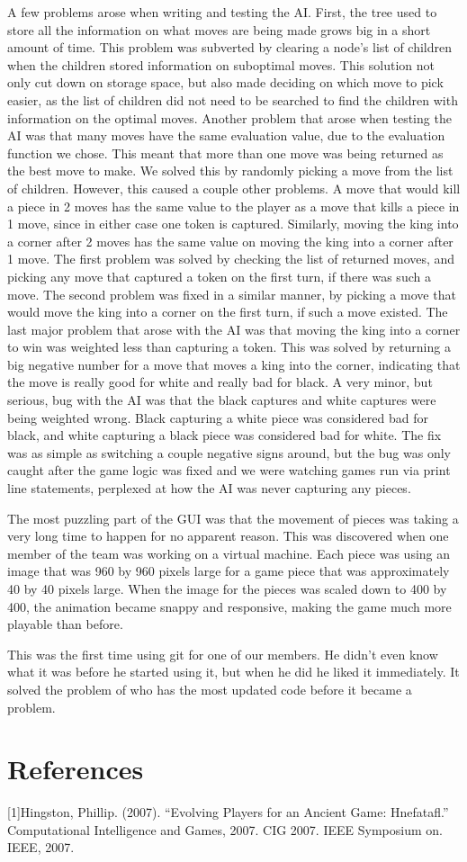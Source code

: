 \documentclass{article}
\begin{document}
	A few problems arose when writing and testing the AI. First, the tree used to store all the information on what moves are being made grows big in a short amount of time. This problem was subverted by clearing a node's list of children when the children stored information on suboptimal moves. This solution not only cut down on storage space, but also made deciding on which move to pick easier, as the list of children did not need to be searched to find the children with information on the optimal moves. Another problem that arose when testing the AI was that many moves have the same evaluation value, due to the evaluation function we chose. This meant that more than one move was being returned as the best move to make. We solved this by randomly picking a move from the list of children. However, this caused a couple other problems. A move that would kill a piece in 2 moves has the same value to the player as a move that kills a piece in 1 move, since in either case one token is captured. Similarly, moving the king into a corner after 2 moves has the same value on moving the king into a corner after 1 move. The first problem was solved by checking the list of returned moves, and picking any move that captured a token on the first turn, if there was such a move. The second problem was fixed in a similar manner, by picking a move that would move the king into a corner on the first turn, if such a move existed. The last major problem that arose with the AI was that moving the king into a corner to win was weighted less than capturing a token. This was solved by returning a big negative number for a move that moves a king into the corner, indicating that the move is really good for white and really bad for black. A very minor, but serious, bug with the AI was that the black captures and white captures were being weighted wrong. Black capturing a white piece was considered bad for black, and white capturing a black piece was considered bad for white. The fix was as simple as switching a couple negative signs around, but the bug was only caught after the game logic was fixed and we were watching games run via print line statements, perplexed at how the AI was never capturing any pieces.\par
	The most puzzling part of the GUI was that the movement of pieces was taking a very long time to happen for no apparent reason. This was discovered when one member of the team was working on a virtual machine. Each piece was using an image that was 960 by 960 pixels large for a game piece that was approximately 40 by 40 pixels large. When the image for the pieces was scaled down to 400 by 400, the animation became snappy and responsive, making the game much more playable than before. \par
	This was the first time using git for one of our members. He didn't even know what it was before he started using it, but when he did he liked it immediately. It solved the problem of who has the most updated code before it became a problem. 

\section{References}
[1]Hingston, Phillip. (2007). “Evolving Players for an Ancient Game: Hnefatafl.” Computational Intelligence and Games, 2007. CIG 2007. IEEE Symposium on. IEEE, 2007.
\end{document}
